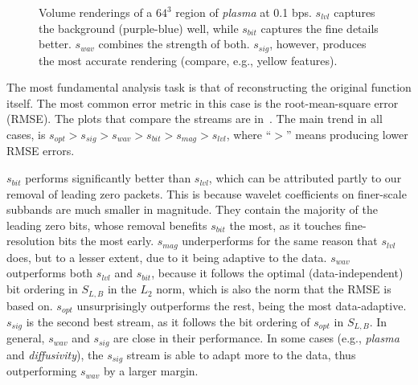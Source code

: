 \begin{figure}[t]
	\centering
	\caption{Volume renderings of a $64^3$ region of \emph{plasma} at 0.1 bps. $s_{lvl}$ captures the background (purple-blue) well, while $s_{bit}$ captures the fine details better. $s_{wav}$
	combines the strength of both. $s_{sig}$, however, produces the most accurate rendering (compare,
	e.g., yellow features).}\label{fig:rmse-rendering}
\end{figure}

The most fundamental analysis task is that of reconstructing the original function itself. The most
common error metric in this case is the root-mean-square error (RMSE). The plots that compare the
streams are in~. The main trend in all cases, is $s_{opt} > s_{sig} >
s_{wav} > s_{bit} > s_{mag} > s_{lvl}$, where ``$>$'' means producing lower RMSE errors.

$s_{bit}$ performs significantly better than $s_{lvl}$, which can be attributed partly to our
removal of leading zero packets. This is because wavelet coefficients on finer-scale subbands are
much smaller in magnitude. They contain the majority of the leading zero bits, whose removal
benefits $s_{bit}$ the most, as it touches fine-resolution bits the most early. $s_{mag}$
underperforms for the same reason that $s_{lvl}$ does, but to a lesser extent, due to it being
adaptive to the data. $s_{wav}$ outperforms both $s_{lvl}$ and $s_{bit}$, because it follows the
optimal (data-independent) bit ordering in $S_{L,B}$ in the $L_2$ norm, which is also the norm that
the RMSE is based on. $s_{opt}$ unsurprisingly outperforms the rest, being the most data-adaptive.
$s_{sig}$ is the second best stream, as it follows the bit ordering of $s_{opt}$ in $S_{L,B}$. In
general, $s_{wav}$ and $s_{sig}$ are close in their performance. In some cases (e.g., \emph{plasma} and
\emph{diffusivity}), the $s_{sig}$ stream is able to adapt more to the data, thus outperforming
$s_{wav}$ by a larger margin.

